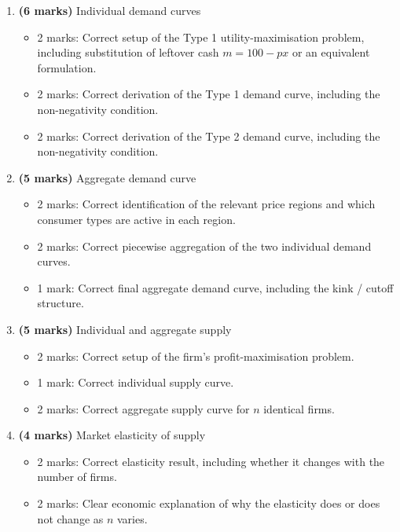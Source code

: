 \documentclass[12pt]{article}
\begin{document}
\begin{enumerate}[label=(\alph*)]
    \item \textbf{(6 marks)} Individual demand curves
    \begin{itemize}
        \item 2 marks: Correct setup of the Type 1 utility-maximisation problem, including substitution of leftover cash \(m=100-px\) or an equivalent formulation.
        \item 2 marks: Correct derivation of the Type 1 demand curve, including the non-negativity condition.
        \item 2 marks: Correct derivation of the Type 2 demand curve, including the non-negativity condition.
    \end{itemize}

    \item \textbf{(5 marks)} Aggregate demand curve
    \begin{itemize}
        \item 2 marks: Correct identification of the relevant price regions and which consumer types are active in each region.
        \item 2 marks: Correct piecewise aggregation of the two individual demand curves.
        \item 1 mark: Correct final aggregate demand curve, including the kink / cutoff structure.
    \end{itemize}

    \item \textbf{(5 marks)} Individual and aggregate supply
    \begin{itemize}
        \item 2 marks: Correct setup of the firm’s profit-maximisation problem.
        \item 1 mark: Correct individual supply curve.
        \item 2 marks: Correct aggregate supply curve for \(n\) identical firms.
    \end{itemize}

    \item \textbf{(4 marks)} Market elasticity of supply
    \begin{itemize}
        \item 2 marks: Correct elasticity result, including whether it changes with the number of firms.
        \item 2 marks: Clear economic explanation of why the elasticity does or does not change as \(n\) varies.
    \end{itemize}


\end{enumerate}
\end{document}
